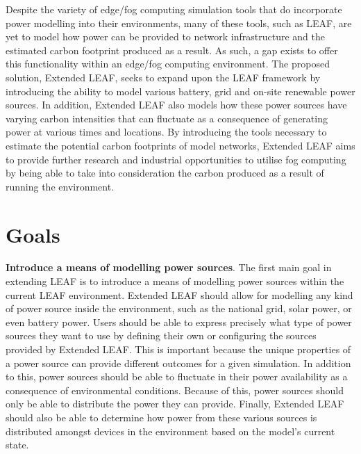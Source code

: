 \documentclass{l4proj}
\begin{document}
Despite the variety of edge/fog computing simulation tools that do incorporate power modelling into their environments, many of these tools, such as LEAF, are yet to model how power can be provided to network infrastructure and the estimated carbon footprint produced as a result.
As such, a gap exists to offer this functionality within an edge/fog computing environment.
The proposed solution, Extended LEAF, seeks to expand upon the LEAF framework by introducing the ability to model various battery, grid and on-site renewable power sources.
In addition, Extended LEAF also models how these power sources have varying carbon intensities that can fluctuate as a consequence of generating power at various times and locations.
By introducing the tools necessary to estimate the potential carbon footprints of model networks, Extended LEAF aims to provide further research and industrial opportunities to utilise fog computing by being able to take into consideration the carbon produced as a result of running the environment.


\section{Goals}\label{intro:subsec:goals}
\textbf{Introduce a means of modelling power sources}.
The first main goal in extending LEAF is to introduce a means of modelling power sources within the current LEAF environment.
Extended LEAF should allow for modelling any kind of power source inside the environment, such as the national grid, solar power, or even battery power.
Users should be able to express precisely what type of power sources they want to use by defining their own or configuring the sources provided by Extended LEAF.
This is important because the unique properties of a power source can provide different outcomes for a given simulation.
In addition to this, power sources should be able to fluctuate in their power availability as a consequence of environmental conditions.
Because of this, power sources should only be able to distribute the power they can provide.
Finally, Extended LEAF should also be able to determine how power from these various sources is distributed amongst devices in the environment based on the model's current state.
\end{document}
